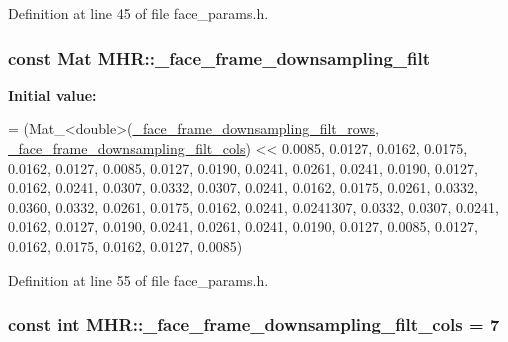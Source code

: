 Definition at line 45 of file face\+\_\+params.\+h.

\hypertarget{namespace_m_h_r_a53c978f9017a65e09546b90474f17111}{
\subsubsection[{\+\_\+face\+\_\+frame\+\_\+downsampling\+\_\+filt}]{\setlength{\rightskip}{0pt plus 5cm}const Mat M\+H\+R\+::\+\_\+face\+\_\+frame\+\_\+downsampling\+\_\+filt}}\label{namespace_m_h_r_a53c978f9017a65e09546b90474f17111}
{\bfseries Initial value\+:}
\begin{DoxyCode}
=
        (Mat\_<double>(\hyperlink{namespace_m_h_r_a7fa6df2df062c81344149450be58164a}{\_face\_frame\_downsampling\_filt\_rows},
      \hyperlink{namespace_m_h_r_ae762029528d214f277ed064282784d3b}{\_face\_frame\_downsampling\_filt\_cols}) <<
           0.0085, 0.0127, 0.0162, 0.0175, 0.0162, 0.0127, 0.0085,
           0.0127, 0.0190, 0.0241, 0.0261, 0.0241, 0.0190, 0.0127,
           0.0162, 0.0241, 0.0307, 0.0332, 0.0307, 0.0241, 0.0162,
           0.0175, 0.0261, 0.0332, 0.0360, 0.0332, 0.0261, 0.0175,
           0.0162, 0.0241, 0.0241307, 0.0332, 0.0307, 0.0241, 0.0162,
           0.0127, 0.0190, 0.0241, 0.0261, 0.0241, 0.0190, 0.0127,
           0.0085, 0.0127, 0.0162, 0.0175, 0.0162, 0.0127, 0.0085)
\end{DoxyCode}


Definition at line 55 of file face\+\_\+params.\+h.

\hypertarget{namespace_m_h_r_ae762029528d214f277ed064282784d3b}{
\subsubsection[{\+\_\+face\+\_\+frame\+\_\+downsampling\+\_\+filt\+\_\+cols}]{\setlength{\rightskip}{0pt plus 5cm}const int M\+H\+R\+::\+\_\+face\+\_\+frame\+\_\+downsampling\+\_\+filt\+\_\+cols = 7}}\label{namespace_m_h_r_ae762029528d214f277ed064282784d3b}


